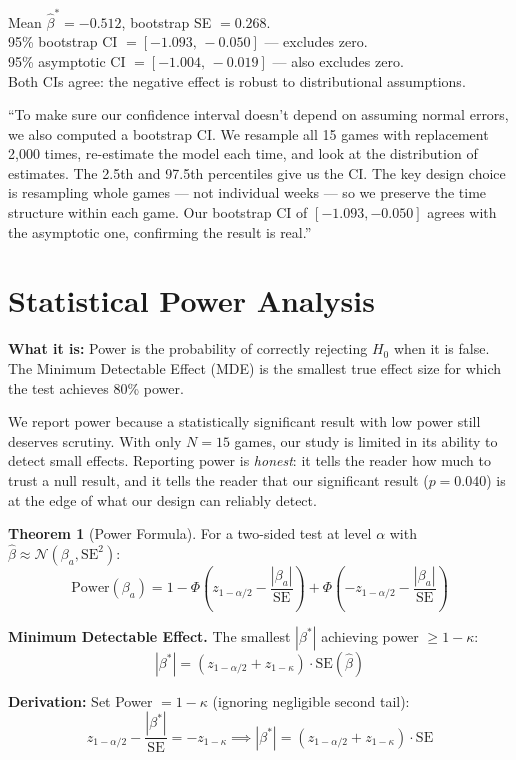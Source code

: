 \documentclass[11pt, letterpaper]{article}
\theoremstyle{definition}
\newtheorem{theorem}{Theorem}[section]
\begin{document}
\begin{resultbox}
Mean $\hat{\beta}^* = -0.512$, bootstrap SE $= 0.268$.\\
95\% bootstrap CI $= [-1.093,\,-0.050]$ --- excludes zero.\\
95\% asymptotic CI $= [-1.004,\,-0.019]$ --- also excludes zero.\\
Both CIs agree: the negative effect is robust to distributional assumptions.
\end{resultbox}

\begin{speakerbox}
``To make sure our confidence interval doesn't depend on assuming normal errors, we also computed a bootstrap CI.
We resample all 15 games with replacement 2,000 times, re-estimate the model each time, and look at the distribution of estimates.
The 2.5th and 97.5th percentiles give us the CI.
The key design choice is resampling whole games --- not individual weeks --- so we preserve the time structure within each game.
Our bootstrap CI of $[-1.093, -0.050]$ agrees with the asymptotic one, confirming the result is real.''
\end{speakerbox}

\section{Statistical Power Analysis}

\textbf{What it is:} Power is the probability of correctly rejecting $H_0$ when it is false. The Minimum Detectable Effect (MDE) is the smallest true effect size for which the test achieves 80\% power.

\begin{whybox}
We report power because a statistically significant result with low power still deserves scrutiny.
With only $N = 15$ games, our study is limited in its ability to detect small effects.
Reporting power is \emph{honest}: it tells the reader how much to trust a null result, and it tells the reader that our significant result ($p = 0.040$) is at the edge of what our design can reliably detect.
\end{whybox}

\begin{mathbox}
\begin{theorem}[Power Formula]
For a two-sided test at level $\alpha$ with $\hat{\beta} \approx \mathcal{N}(\beta_a, \text{SE}^2)$:
\[
    \text{Power}(\beta_a) = 1 - \Phi\!\left(z_{1-\alpha/2} - \frac{|\beta_a|}{\text{SE}}\right) + \Phi\!\left(-z_{1-\alpha/2} - \frac{|\beta_a|}{\text{SE}}\right)
\]
\end{theorem}

\textbf{Minimum Detectable Effect.} The smallest $|\beta^*|$ achieving power $\geq 1-\kappa$:
\[
    |\beta^*| = (z_{1-\alpha/2} + z_{1-\kappa})\cdot\text{SE}(\hat{\beta})
\]

\textbf{Derivation:} Set Power $= 1-\kappa$ (ignoring negligible second tail):
\[
    z_{1-\alpha/2} - \frac{|\beta^*|}{\text{SE}} = -z_{1-\kappa}
    \implies |\beta^*| = (z_{1-\alpha/2} + z_{1-\kappa})\cdot\text{SE}
\]
\end{mathbox}
\end{document}
